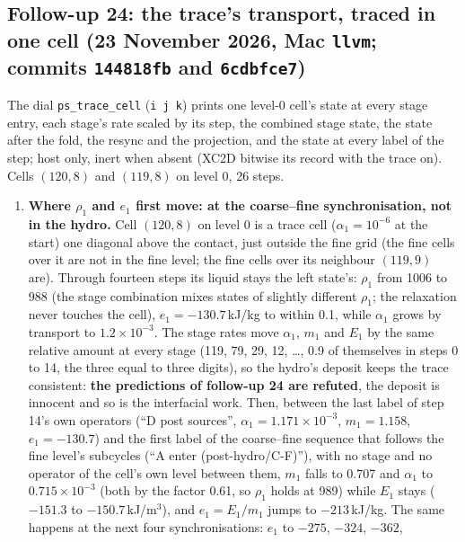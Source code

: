 \documentclass[11pt,a4paper]{article}
\newcommand{\code}[1]{\texttt{\small #1}}
\begin{document}
\subsection{Follow-up 24: the trace's transport, traced in one cell (23 November 2026, Mac \code{llvm}; commits \code{144818fb} and \code{6cdbfce7})}

The dial \code{ps\_trace\_cell} (\code{i j k}) prints one level-0
cell's state at every stage entry, each stage's rate scaled by its
step, the combined stage state, the state after the fold, the resync
and the projection, and the state at every label of the step; host
only, inert when absent (XC2D bitwise its record with the trace on).
Cells $(120, 8)$ and $(119, 8)$ on level 0, 26 steps.
\begin{enumerate}[nosep]
\item \textbf{Where $\rho_1$ and $e_1$ first move: at the coarse--fine
      synchronisation, not in the hydro.}  Cell $(120, 8)$ on level 0 is
      a trace cell ($\alpha_1 = 10^{-6}$ at the start) one diagonal above
      the contact, just outside the fine grid (the fine cells over it
      are not in the fine level; the fine cells over its neighbour
      $(119, 9)$ are).  Through fourteen steps its liquid stays the left
      state's: $\rho_1$ from 1006 to 988 (the stage combination mixes
      states of slightly different $\rho_1$; the relaxation never
      touches the cell), $e_1 = -130.7$\,kJ/kg to within 0.1, while
      $\alpha_1$ grows by transport to $1.2\times10^{-3}$.  The stage
      rates move $\alpha_1$, $m_1$ and $E_1$ by the same relative amount
      at every stage (119, 79, 29, 12, \ldots, 0.9 of themselves in
      steps 0 to 14, the three equal to three digits), so the hydro's
      deposit keeps the trace consistent: \textbf{the predictions of
      follow-up 24 are refuted}, the deposit is innocent and so is the
      interfacial work.  Then, between the last label of step 14's own
      operators (``D post sources'', $\alpha_1 = 1.171\times10^{-3}$,
      $m_1 = 1.158$, $e_1 = -130.7$) and the first label of the
      coarse--fine sequence that follows the fine level's subcycles
      (``A enter (post-hydro/C-F)''), with no stage and no operator of the
      cell's own level between them, $m_1$ falls to 0.707 and $\alpha_1$
      to $0.715\times10^{-3}$ (both by the factor 0.61, so $\rho_1$ holds
      at 989) while $E_1$ stays ($-151.3$ to $-150.7$\,kJ/m$^3$), and
      $e_1 = E_1/m_1$ jumps to $-213$\,kJ/kg.  The same happens at the
      next four synchronisations: $e_1$ to $-275$, $-324$, $-362$,

\end{enumerate}
\end{document}
